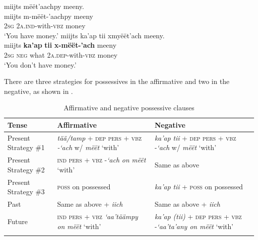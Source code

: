 \documentclass[output=paper,colorlinks,citecolor=brown,draft]{langscibook}
\begin{document}
\ea\label{ex:mix:81}
    \ea\label{ex:mix:81a}
        \glll miijts mëët’aachpy meeny.\\ 
              miijts m-mëët-’aachpy meeny\\
              \textsc{2sg} \textsc{2a.ind}{}-with-\textsc{vbz} money\\
        \glt ‘You have money.’
    \ex\label{ex:mix:81b}
        \glll  miijts ka’ap tii xmyëët’ach meeny. \\
             miijts \textbf{ka’ap} \textbf{tii} \textbf{x-mëët-’ach} meeny\\
             \textsc{2sg} \textsc{neg} what \textsc{2a.dep}{}-with-\textsc{vbz} money\\
        \glt ‘You don’t have money.’
    \z
\z 


\largerpage
There are three strategies for possessives in the affirmative and two in the negative, as shown in .

\begin{table}
\begin{tabularx}{\textwidth}{lQ@{~~}Q@{}}
\lsptoprule
{Tense} & {Affirmative} & {Negative}\\
\midrule 
{Present Strategy \#1} & {\textit{tää/tamp} + \textsc{dep} \textsc{pers} + \textsc{vbz} {}\textit{-‘ach} w/ \textit{mëët} ‘with’} & {\textit{ka’ap tii} + \textsc{dep} \textsc{pers} + \textsc{vbz} {}-\textit{‘ach} w/ \textit{mëët} ‘with’} \\ 
\tablevspace
{Present Strategy \#2} & {\textsc{ind} \textsc{pers} \textsc{+} \textsc{vbz} {}-\textit{‘ach on mëët} ‘with’} & {Same as above} \\
\tablevspace
{Present Strategy \#3} & {\textsc{poss} on possessed} & {\textit{ka’ap tii} + \textsc{poss} on possessed}\\
\tablevspace
{Past} & {Same as above + \textit{iich}} & {Same as above + \textit{iich}}\\
\tablevspace
{Future} & {\textsc{ind} \textsc{pers} \textsc{+} \textsc{vbz} \textit{‘aa’täämpy on mëët} ‘with’} & {\textit{ka’ap (tii)} + \textsc{dep} \textsc{pers} + \textsc{vbz} \textsc{-}\textit{‘aa’ta’any on mëët} ‘with’} \\
\lspbottomrule
\end{tabularx}
\caption{Affirmative and negative possessive clauses}
\label{tab:mix:8}
\end{table}
\end{document}
